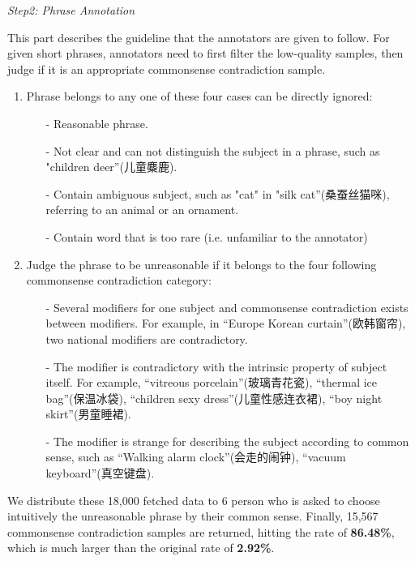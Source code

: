 \textit{Step2: Phrase Annotation}

This part describes the guideline that the annotators are given to follow.
For given short phrases, annotators need to first filter the low-quality samples, then judge if it is an appropriate commonsense contradiction sample.
\begin{enumerate}
	\item Phrase belongs to any one of these four cases can be directly ignored: 
	\begin{itemize}
		\item [-] Reasonable phrase. %
		\item [-] Not clear and can not distinguish the subject in a phrase, such as "children deer''(儿童麋鹿).
		\item [-] Contain ambiguous subject, such as "cat" in "silk cat''(桑蚕丝猫咪), referring to an animal or an ornament.
		\item [-] Contain word that is too rare (i.e. unfamiliar to the annotator)
	\end{itemize}
	\item Judge the phrase to be unreasonable if it belongs to the four following commonsense contradiction category:
	\begin{itemize}
		\item [-] Several modifiers for one subject and commonsense contradiction exists between modifiers. For example, in ``Europe Korean curtain''(欧韩窗帘), two national modifiers are contradictory.
		\item [-] The modifier is contradictory with the intrinsic property of subject itself. For example, ``vitreous porcelain''(玻璃青花瓷), ``thermal ice bag''(保温冰袋), ``children sexy dress''(儿童性感连衣裙), ``boy night skirt''(男童睡裙).
		\item [-] The modifier is strange for describing the subject %
		according to common sense, such as ``Walking alarm clock''(会走的闹钟), ``vacuum keyboard''(真空键盘).
	\end{itemize}
\end{enumerate}

We distribute these 18,000 fetched data to 6 person who is asked to choose intuitively the unreasonable phrase by their common sense. Finally, 15,567 commonsense contradiction samples are returned, hitting the rate of \textbf{86.48\%}, which is much larger than the original rate of \textbf{2.92\%}.

